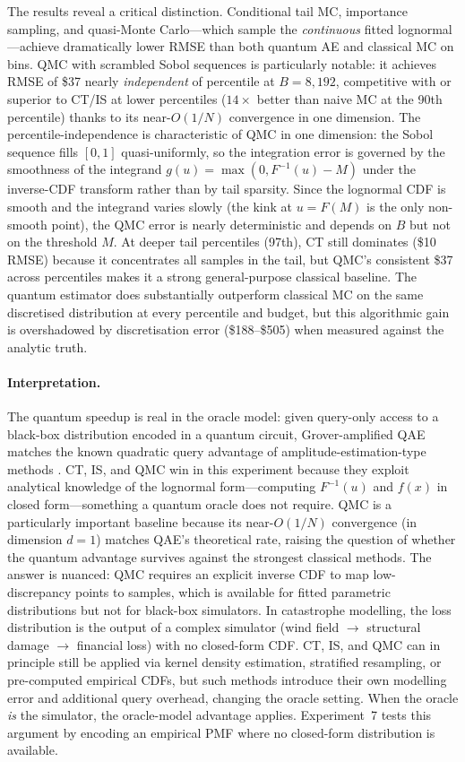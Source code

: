 \documentclass[11pt,a4paper]{article}
\begin{document}
The results reveal a critical distinction. Conditional tail MC, importance sampling, and quasi-Monte Carlo---which sample the \emph{continuous} fitted lognormal---achieve dramatically lower RMSE than both quantum AE and classical MC on bins. QMC with scrambled Sobol sequences is particularly notable: it achieves RMSE of \$37 nearly \emph{independent} of percentile at $B = 8{,}192$, competitive with or superior to CT/IS at lower percentiles ($14\times$ better than naive MC at the 90th percentile) thanks to its near-$O(1/N)$ convergence in one dimension. The percentile-independence is characteristic of QMC in one dimension: the Sobol sequence fills $[0,1]$ quasi-uniformly, so the integration error is governed by the smoothness of the integrand $g(u) = \max(0, F^{-1}(u) - M)$ under the inverse-CDF transform rather than by tail sparsity. Since the lognormal CDF is smooth and the integrand varies slowly (the kink at $u = F(M)$ is the only non-smooth point), the QMC error is nearly deterministic and depends on $B$ but not on the threshold $M$. At deeper tail percentiles (97th), CT still dominates (\$10 RMSE) because it concentrates all samples in the tail, but QMC's consistent \$37 across percentiles makes it a strong general-purpose classical baseline. The quantum estimator does substantially outperform classical MC on the same discretised distribution at every percentile and budget, but this algorithmic gain is overshadowed by discretisation error (\$188--\$505) when measured against the analytic truth.

\paragraph{Interpretation.} The quantum speedup is real in the oracle model: given query-only access to a black-box distribution encoded in a quantum circuit, Grover-amplified QAE matches the known quadratic query advantage of amplitude-estimation-type methods \cite{Brassard2002}. CT, IS, and QMC win in this experiment because they exploit analytical knowledge of the lognormal form---computing $F^{-1}(u)$ and $f(x)$ in closed form---something a quantum oracle does not require. QMC is a particularly important baseline because its near-$O(1/N)$ convergence (in dimension $d=1$) matches QAE's theoretical rate, raising the question of whether the quantum advantage survives against the strongest classical methods. The answer is nuanced: QMC requires an explicit inverse CDF to map low-discrepancy points to samples, which is available for fitted parametric distributions but not for black-box simulators. In catastrophe modelling, the loss distribution is the output of a complex simulator (wind field $\to$ structural damage $\to$ financial loss) with no closed-form CDF. CT, IS, and QMC can in principle still be applied via kernel density estimation, stratified resampling, or pre-computed empirical CDFs, but such methods introduce their own modelling error and additional query overhead, changing the oracle setting. When the oracle \emph{is} the simulator, the oracle-model advantage applies. Experiment~7 tests this argument by encoding an empirical PMF where no closed-form distribution is available.
\end{document}
